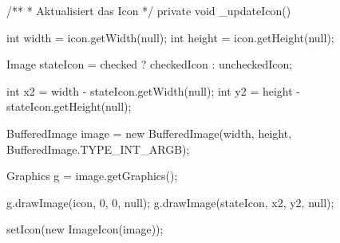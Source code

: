 \begin{figure}[H]
\begin{spacing}{0.75}
\begin{javacode}[firstnumber=20]
  
  /**
  * Aktualisiert das Icon
  */
  private void _updateIcon()
  {
    int width = icon.getWidth(null);
    int height = icon.getHeight(null);
    
    Image stateIcon = checked ? checkedIcon : uncheckedIcon;
    
    int x2 = width - stateIcon.getWidth(null);
    int y2 = height - stateIcon.getHeight(null);
    
    BufferedImage image = new BufferedImage(width, height, BufferedImage.TYPE_INT_ARGB);
    
    Graphics g = image.getGraphics();
    
    g.drawImage(icon, 0, 0, null);
    g.drawImage(stateIcon, x2, y2, null);
    
    setIcon(new ImageIcon(image));
  }
\end{javacode}
\end{spacing}
\end{figure}